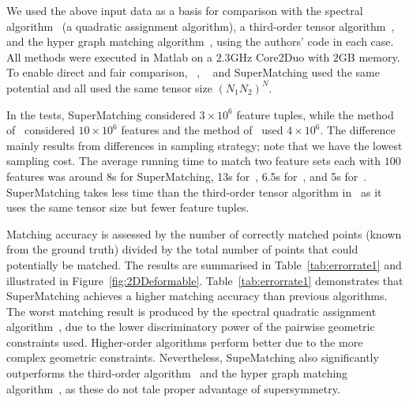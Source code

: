 We used the above input data as a basis for comparison with the spectral algorithm~\cite{Cour06} (a quadratic assignment algorithm),
a third-order tensor algorithm~\cite{Duchenne09},
and the hyper graph matching algorithm~\cite{Zass08}, using the authors' code in each case.
All methods were executed in Matlab on a $2.3$GHz Core2Duo with $2$GB memory.
To enable direct and fair comparison,
~\cite{Duchenne09}, ~\cite{Zass08} and SuperMatching
used the same potential and all used the same tensor size $(N_1N_2)^N$.

In the tests, SuperMatching considered $3\times 10^6$ feature tuples, while the method of~\cite{Duchenne09} considered $10\times 10^6$ features  and the method of~\cite{Zass08} used $4\times 10^6$.
The difference  mainly results from differences in sampling strategy; note that we have the lowest  sampling cost.
The average running time to match two feature sets each with $100$ features was around 8s for SuperMatching, 13s for~\cite{Duchenne09}, 6.5s for~\cite{Zass08}, and 5s for~\cite{Cour06}.
SuperMatching takes less  time than the third-order tensor algorithm in~\cite{Duchenne09} as it uses the same tensor size but fewer feature tuples.

Matching accuracy is assessed by the number of correctly matched points (known from the  ground truth) divided by the total number of points that could potentially be matched.
The results are summarised in Table~\ref{tab:errorrate1} and illustrated in Figure~\ref{fig:2DDeformable}.
Table~\ref{tab:errorrate1} demonstrates that SuperMatching achieves a higher matching accuracy than previous algorithms.
The worst matching result is produced by the spectral quadratic assignment algorithm~\cite{Cour06},
due to the lower discriminatory power of the pairwise geometric constraints used.
Higher-order algorithms perform  better due to the more complex geometric constraints.
Nevertheless, SupeMatching also significantly outperforms the third-order algorithm~\cite{Duchenne09} and the hyper graph matching algorithm~\cite{Zass08}, as these do not tale proper advantage of supersymmetry.

